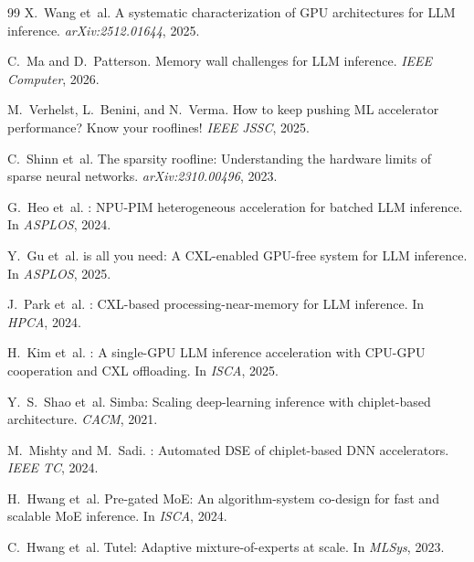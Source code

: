 \documentclass[sigconf,10pt]{acmart}
\begin{document}
\begin{thebibliography}{99}
X.~Wang et~al.
\newblock A systematic characterization of {GPU} architectures for {LLM}
  inference.
\newblock \emph{arXiv:2512.01644}, 2025.

C.~Ma and D.~Patterson.
\newblock Memory wall challenges for {LLM} inference.
\newblock \emph{IEEE Computer}, 2026.

M.~Verhelst, L.~Benini, and N.~Verma.
\newblock How to keep pushing {ML} accelerator performance? Know your rooflines!
\newblock \emph{IEEE JSSC}, 2025.

C.~Shinn et~al.
\newblock The sparsity roofline: Understanding the hardware limits of sparse
  neural networks.
\newblock \emph{arXiv:2310.00496}, 2023.


G.~Heo et~al.
: {NPU-PIM} heterogeneous acceleration for batched {LLM}
  inference.
\newblock In \emph{ASPLOS}, 2024.

Y.~Gu et~al.
 is all you need: A {CXL}-enabled {GPU}-free system for {LLM}
  inference.
\newblock In \emph{ASPLOS}, 2025.

J.~Park et~al.
: {CXL}-based processing-near-memory for {LLM} inference.
\newblock In \emph{HPCA}, 2024.

H.~Kim et~al.
: A single-{GPU} {LLM} inference acceleration with {CPU-GPU}
  cooperation and {CXL} offloading.
\newblock In \emph{ISCA}, 2025.


Y.~S.~Shao et~al.
\newblock Simba: Scaling deep-learning inference with chiplet-based
  architecture.
\newblock \emph{CACM}, 2021.

M.~Mishty and M.~Sadi.
: Automated {DSE} of chiplet-based {DNN} accelerators.
\newblock \emph{IEEE TC}, 2024.


H.~Hwang et~al.
\newblock Pre-gated {MoE}: An algorithm-system co-design for fast and scalable
  {MoE} inference.
\newblock In \emph{ISCA}, 2024.

C.~Hwang et~al.
\newblock Tutel: Adaptive mixture-of-experts at scale.
\newblock In \emph{MLSys}, 2023.


\end{thebibliography}
\end{document}
